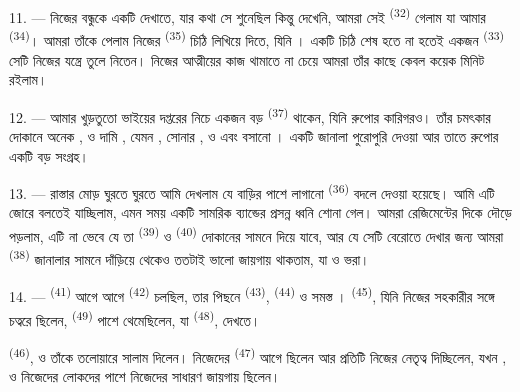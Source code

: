 \VUsaut{3.0mm}

11. --- নিজের বন্ধুকে একটি  দেখাতে, যার কথা সে শুনেছিল
কিন্তু দেখেনি, আমরা সেই  \textsuperscript{(32)} গেলাম যা আমার
 \textsuperscript{(34)}। আমরা তাঁকে পেলাম নিজের
 \textsuperscript{(35)} চিঠি লিখিয়ে দিতে, যিনি
। একটি চিঠি শেষ হতে না হতেই একজন 
\textsuperscript{(33)} সেটি নিজের যন্ত্রে তুলে নিতেন। নিজের আত্মীয়ের কাজ থামাতে
না চেয়ে আমরা তাঁর কাছে কেবল কয়েক মিনিট রইলাম।

12. --- আমার খুড়তুতো ভাইয়ের দপ্তরের নিচে একজন বড় 
\textsuperscript{(37)} থাকেন, যিনি রুপোর কারিগরও। তাঁর চমৎকার দোকানে অনেক
,  ও দামি ,
যেমন , সোনার ,  ও
 এবং  বসানো । একটি জানালা পুরোপুরি
 দেওয়া আর তাতে রুপোর  একটি বড়
সংগ্রহ।

13. --- রাস্তার মোড় ঘুরতে ঘুরতে আমি দেখলাম যে বাড়ির  পাশে
লাগানো  \textsuperscript{(36)} বদলে দেওয়া হয়েছে। আমি এটি জোরে
বলতেই যাচ্ছিলাম, এমন সময় একটি সামরিক ব্যান্ডের প্রসন্ন ধ্বনি শোনা গেল। আমরা
রেজিমেন্টের দিকে দৌড়ে পড়লাম, এটি না ভেবে যে তা 
\textsuperscript{(39)} ও  \textsuperscript{(40)} দোকানের
সামনে দিয়ে যাবে, আর যে সেটি বেরোতে দেখার জন্য আমরা 
\textsuperscript{(38)} জানালার সামনে দাঁড়িয়ে থেকেও ততটাই ভালো জায়গায় থাকতাম,
যা  ও  ভরা।

\VUsaut{3.0mm}

14. ---  \textsuperscript{(41)} আগে আগে 
\textsuperscript{(42)} চলছিল, তার পিছনে  \textsuperscript{(43)},
 \textsuperscript{(44)} ও সমস্ত ।
 \textsuperscript{(45)}, যিনি নিজের সহকারীর সঙ্গে চত্বরে ছিলেন,
 \textsuperscript{(49)} পাশে থেমেছিলেন, যা 
\textsuperscript{(48)},  দেখতে।

 \textsuperscript{(46)},  ও
 তাঁকে তলোয়ারে সালাম দিলেন।  নিজেদের
 \textsuperscript{(47)} আগে ছিলেন আর প্রতিটি
 নিজের  নেতৃত্ব দিচ্ছিলেন, যখন
,  ও  নিজেদের লোকদের পাশে নিজেদের সাধারণ জায়গায় ছিলেন।

